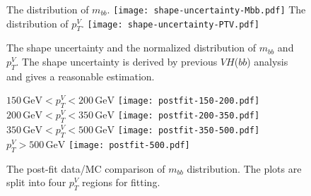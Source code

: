 \documentclass[class=NTHU_thesis, crop=false]{standalone}
\begin{document}
\begin{figure}[!hbt]
	\centering
	\subcaptionbox
	{The distribution of $m_{bb}$.
		\label{fig:shape-uncertainty-fig1}}
		{\texttt{[image: shape-uncertainty-Mbb.pdf]}}
	\vspace{\baselineskip}
	\subcaptionbox
	{The distribution of $p^V_T$.
		\label{fig:shape-uncertainty-fig2}}
		{\texttt{[image: shape-uncertainty-PTV.pdf]}}
	\caption{The shape uncertainty and the normalized distribution of $m_{bb}$ and $p^V_T$. The shape uncertainty is derived by previous $VH$($bb$) analysis and gives a reasonable estimation.}
	\label{fig:shape-uncertainty}
\end{figure}

\begin{figure}[!hbt]
	\captionsetup[subfigure]{labelformat=empty}
	\centering
	\subcaptionbox
	{$150\, \mathrm{GeV} < p^V_T < 200\, \mathrm{GeV}$
		\label{fig:2-lep-postfit-fig1}}
		{\texttt{[image: postfit-150-200.pdf]}}
	~
	\subcaptionbox
	{$200\, \mathrm{GeV} < p^V_T < 350\, \mathrm{GeV}$
		\label{fig:2-lep-postfit-fig2}}
		{\texttt{[image: postfit-200-350.pdf]}}
	\vspace{\baselineskip}
	\subcaptionbox
	{$350\, \mathrm{GeV} < p^V_T < 500\, \mathrm{GeV}$
		\label{fig:2-lep-postfit-fig3}}
		{\texttt{[image: postfit-350-500.pdf]}}
	~
	\subcaptionbox
	{$p^V_T > 500\, \mathrm{GeV}$
		\label{fig:2-lep-postfit-fig4}}
		{\texttt{[image: postfit-500.pdf]}}
	\caption{The post-fit data/MC comparison of $m_{bb}$ distribution. The plots are split into four $p^V_T$ regions for fitting.}
	\label{fig:2-lep-postfit}
\end{figure}
\end{document}
